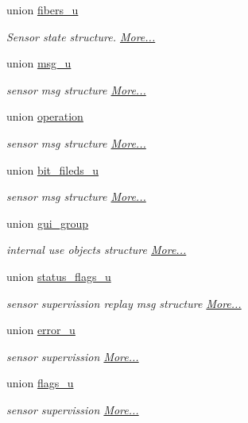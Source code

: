 \begin{DoxyCompactItemize}
union \hyperlink{a00001_d6/d2c/a00072}{fibers\+\_\+u}
\begin{DoxyCompactList}\small\item\em Sensor state structure.  \hyperlink{a00001_d6/d2c/a00072}{More...}\end{DoxyCompactList}\item 
union \hyperlink{a00001_da/d2a/a00086}{msg\+\_\+u}
\begin{DoxyCompactList}\small\item\em sensor msg structure  \hyperlink{a00001_da/d2a/a00086}{More...}\end{DoxyCompactList}\item 
union \hyperlink{a00001_d9/dec/a00090}{operation}
\begin{DoxyCompactList}\small\item\em sensor msg structure  \hyperlink{a00001_d9/dec/a00090}{More...}\end{DoxyCompactList}\item 
union \hyperlink{a00001_d9/d2e/a00056}{bit\+\_\+fileds\+\_\+u}
\begin{DoxyCompactList}\small\item\em sensor msg structure  \hyperlink{a00001_d9/d2e/a00056}{More...}\end{DoxyCompactList}\item 
union \hyperlink{a00001_d9/da4/a00078}{gui\+\_\+group}
\begin{DoxyCompactList}\small\item\em internal use objects structure  \hyperlink{a00001_d9/da4/a00078}{More...}\end{DoxyCompactList}\item 
union \hyperlink{a00001_d0/de8/a00133}{status\+\_\+flags\+\_\+u}
\begin{DoxyCompactList}\small\item\em sensor supervission replay msg structure  \hyperlink{a00001_d0/de8/a00133}{More...}\end{DoxyCompactList}\item 
union \hyperlink{a00001_d4/d31/a00069}{error\+\_\+u}
\begin{DoxyCompactList}\small\item\em sensor supervission  \hyperlink{a00001_d4/d31/a00069}{More...}\end{DoxyCompactList}\item 
union \hyperlink{a00001_db/db6/a00074}{flags\+\_\+u}
\begin{DoxyCompactList}\small\item\em sensor supervission  \hyperlink{a00001_db/db6/a00074}{More...}\end{DoxyCompactList}\item 

\end{DoxyCompactItemize}

